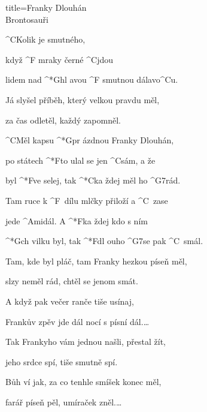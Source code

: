\begin{song}{title=\predtitle\centering Franky Dlouhán \\\large Brontosauři  \vspace*{-0.3cm}}  %
\begin{centerjustified}
\nejvetsi

\sloka 
	^{C}Kolik je smutného,
	
	když ^{F \z}mraky černé ^{C}jdou

	lidem nad ^*{G}hl avou ^{F \z}smutnou dálavo^{C}u.
	
	Já slyšel příběh, který velkou pravdu měl,
	
	za čas odletěl, každý zapomněl.

	^{C}Měl kapsu ^*{G}pr ázdnou Franky Dlouhán,

	po státech ^*{F}to ulal se jen ^{C}sám, a že

	byl ^*{F}ve selej, tak ^*{C}ka ždej měl ho ^{G7}rád.

	Tam ruce k ^{F\,\,\,}dílu mlčky přiloží a ^{C\,\,\,}zase

	jede ^{Ami}dál. A ^*{F}ka ždej kdo s ním

	^*{G}ch vilku byl, tak ^*{F}dl ouho ^{G7}se pak ^{C\,\,\,}smál.
	
\sloka	
	Tam, kde byl pláč, tam Franky hezkou píseň měl,
	
	slzy neměl rád, chtěl se jenom smát.
	
	A když pak večer ranče tiše usínaj,
	
	Frankův zpěv jde dál nocí s písní dál.\elipsa\dots
	
\sloka
	Tak Frankyho vám jednou našli, přestal žít,
	
	jeho srdce spí, tiše smutně spí.
	
	Bůh ví jak, za co tenhle smíšek konec měl,
	
	farář píseň pěl, umíraček zněl.\elipsa\dots

\end{centerjustified}

\centering
{}

\setcounter{Slokočet}{0}
\end{song}
